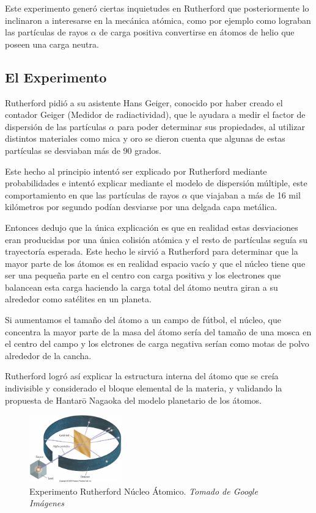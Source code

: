 \documentclass[journal]{IEEEtran}
\begin{document}
Este experimento generó ciertas inquietudes en Rutherford que posteriormente lo inclinaron a interesarse en la mecánica atómica, como por ejemplo como lograban
las partículas de rayos $\alpha$ de carga positiva convertirse en átomos de helio que poseen una carga neutra.

\subsection{El Experimento}

Rutherford pidió a su asistente Hans Geiger, conocido por haber creado el contador Geiger (Medidor de radiactividad), que le ayudara a medir el factor de dispersión
de las partículas $\alpha$ para poder determinar sus propiedades, al utilizar distintos materiales como mica y oro se dieron cuenta que algunas de estas partículas se desviaban 
más de 90 grados. 

Este hecho al principio intentó ser explicado por Rutherford mediante probabilidades e intentó explicar mediante el modelo de 
dispersión múltiple, este comportamiento en que las partículas de rayos $\alpha$ que viajaban a más de 16 mil kilómetros por segundo podían desviarse por una
delgada capa metálica.

Entonces dedujo que la única explicación es que en realidad estas desviaciones eran producidas por una única colisión atómica y el resto de partículas seguía su trayectoría esperada.
Este hecho le sirvió a Rutherford para determinar que la mayor parte de los átomos es en realidad espacio vacío y que el núcleo tiene que ser una pequeña parte en el centro con carga positiva 
y los electrones que balancean esta carga haciendo la carga total del átomo neutra giran a su alrededor como satélites en un planeta.

Si aumentamos el tamaño del átomo a un campo de fútbol, el núcleo, que concentra la mayor parte de la masa del átomo sería del tamaño de una mosca en el centro 
del campo y los elctrones de carga negativa serían como motas de polvo alrededor de la  cancha.

Rutherford logró así explicar la estructura interna del átomo que se creía indivisible y considerado el bloque elemental de la materia, y validando la propuesta de Hantarō Nagaoka del modelo planetario de los 
átomos. \cite{crease_2014}

\begin{center}
  \begin{figure}[h!]
  \includegraphics[width=40mm]{rutherford2.jpg}
  \caption{Experimento Rutherford Núcleo Átomico. \emph{Tomado de Google Imágenes}}
  \end{figure}
\end{center}
\end{document}
